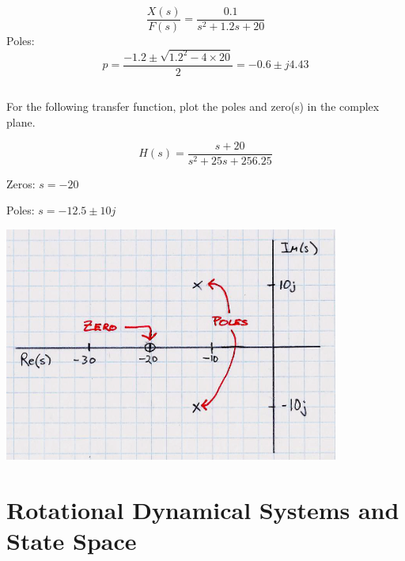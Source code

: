 \documentclass{article}	%
\begin{document}
\begin{solution}
\[
\frac {X(s)}  {F(s)} = \frac { 0.1 }  { s^2 + 1.2s + 20}
\]
Poles:
\[
p = \frac {-1.2\pm\sqrt{1.2^2 - 4\times20}}   {2} = -0.6 \pm j 4.43
\]
\end{solution}

\subsection{} For the following transfer function, plot the poles and zero(s) in the complex plane.

\[
H(s) = \frac   {s+20}  {s^2 + 25s + 256.25}
\]

\begin{solution}

Zeros:  $s=-20$

Poles: $s = -12.5\pm10j$

\includegraphics[width=110mm]{01076.png}

\end{solution}






\newpage
\section{Rotational Dynamical Systems and State Space}

\subsection{}
\end{document}
